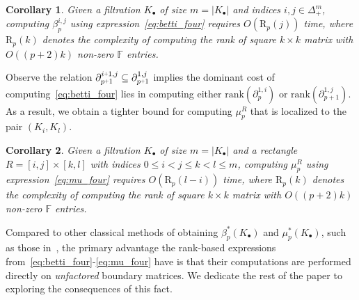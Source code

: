 \documentclass[10pt]{article}
\numberwithin{equation}{section}
\newcommand{\+}{%
	\raisebox{0.18ex}{\scaleobj{0.55}{+}}
}
\newtheorem{corollary}{Corollary}
\theoremstyle{definition}
\begin{document}
\begin{corollary}
	Given a filtration $K_\bullet$ of size $m = \lvert K_\bullet \rvert$ and indices $i,j \in \Delta_+^m$, computing $\beta_p^{i,j}$ using expression~\eqref{eq:betti_four} requires $O(\mathrm{R}_{p}(j))$ time, where $\mathrm{R}_p(k)$ denotes the complexity of computing the rank of square $k \times k$ matrix with $O((p+2)k)$ non-zero $\mathbb{F}$ entries. 
\end{corollary} 
\noindent Observe the relation $\partial_{p\+1}^{i \+ 1, j} \subseteq \partial_{p\+1}^{1, j}$ implies the  dominant cost of computing~\eqref{eq:betti_four} lies in computing either $\mathrm{rank}(\partial_p^{1,i})$ or $\mathrm{rank}(\partial_{p+1}^{1,j})$. As a result, we obtain a tighter bound for computing $\mu_p^R$ that is localized to the pair $(K_i, K_l)$. 
\begin{corollary}
	Given a filtration $K_\bullet$ of size $m = \lvert K_\bullet \rvert$ and a rectangle $R = [i,j] \times [k,l]$ with indices $0 \leq i < j \leq k < l \leq m$, computing $\mu_p^{R}$ using expression~\eqref{eq:mu_four} requires $O(\mathrm{R}_{p}(l - i))$ time, where $\mathrm{R}_p(k)$ denotes the complexity of computing the rank of square $k \times k$ matrix with $O((p+2)k)$ non-zero $\mathbb{F}$ entries.
\end{corollary} 

\noindent Compared to other classical methods of obtaining $\beta_p^{\ast}(K_\bullet)$ and $\mu_p^\ast(K_\bullet)$, such as those in~\cite{edelsbrunner2022computational, zomorodian2004computing}, the primary advantage the rank-based expressions from~\eqref{eq:betti_four}-\eqref{eq:mu_four} have is that their computations are performed directly on \emph{unfactored} boundary matrices. 
We dedicate the rest of the paper to exploring the consequences of this fact. 

\end{document}
